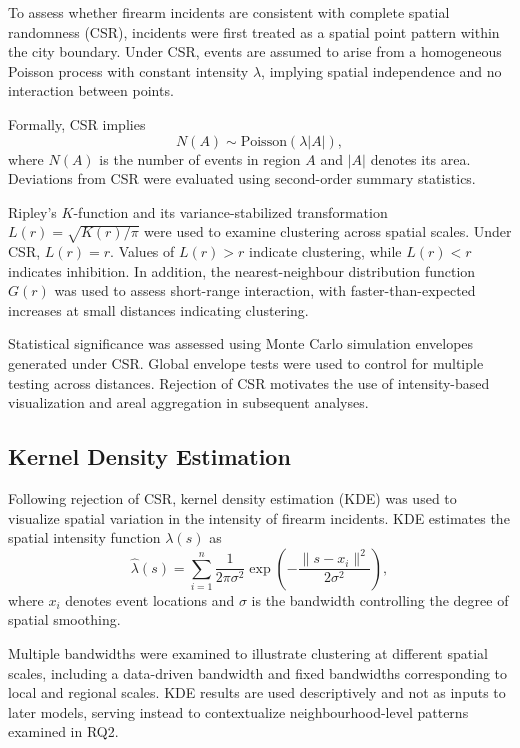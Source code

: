 \documentclass{article}
\begin{document}
\noindent To assess whether firearm incidents are consistent with complete spatial randomness (CSR), incidents were first treated as a spatial point pattern within the city boundary. Under CSR, events are assumed to arise from a homogeneous Poisson process with constant intensity $\lambda$, implying spatial independence and no interaction between points.

\noindent Formally, CSR implies
\[
N(A) \sim \text{Poisson}(\lambda |A|),
\]
where $N(A)$ is the number of events in region $A$ and $|A|$ denotes its area. Deviations from CSR were evaluated using second-order summary statistics.

\noindent Ripley’s $K$-function and its variance-stabilized transformation $L(r) = \sqrt{K(r)/\pi}$ were used to examine clustering across spatial scales. Under CSR, $L(r) = r$. Values of $L(r) > r$ indicate clustering, while $L(r) < r$ indicates inhibition. In addition, the nearest-neighbour distribution function $G(r)$ was used to assess short-range interaction, with faster-than-expected increases at small distances indicating clustering.

\noindent Statistical significance was assessed using Monte Carlo simulation envelopes generated under CSR. Global envelope tests were used to control for multiple testing across distances. Rejection of CSR motivates the use of intensity-based visualization and areal aggregation in subsequent analyses.

\subsection{Kernel Density Estimation}

\noindent Following rejection of CSR, kernel density estimation (KDE) was used to visualize spatial variation in the intensity of firearm incidents. KDE estimates the spatial intensity function $\lambda(s)$ as
\[
\hat{\lambda}(s) = \sum_{i=1}^{n} \frac{1}{2\pi\sigma^2}
\exp\left(-\frac{\|s - x_i\|^2}{2\sigma^2}\right),
\]
where $x_i$ denotes event locations and $\sigma$ is the bandwidth controlling the degree of spatial smoothing.

\noindent Multiple bandwidths were examined to illustrate clustering at different spatial scales, including a data-driven bandwidth and fixed bandwidths corresponding to local and regional scales. KDE results are used descriptively and not as inputs to later models, serving instead to contextualize neighbourhood-level patterns examined in RQ2.
\end{document}
